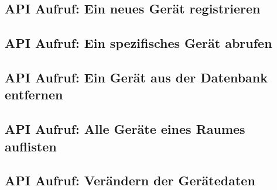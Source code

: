 \subsection{API Aufruf: Ein neues Gerät registrieren}
\label{app:API_register_device}

\subsection{API Aufruf: Ein spezifisches Gerät abrufen}
\label{app:API_get_device}

\subsection{API Aufruf: Ein Gerät aus der Datenbank entfernen}
\label{app:API_delete_device}

\subsection{API Aufruf: Alle Geräte eines Raumes auflisten}
\label{app:API_show_devices}

\subsection{API Aufruf: Verändern der Gerätedaten}
\label{app:API_patch_device}




%

